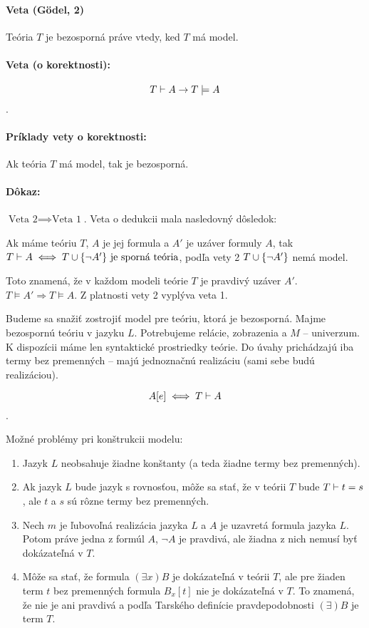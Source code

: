\paragraph{Veta (G\"odel, 2)} Teória $T$ je bezosporná práve vtedy, ked $T$ má
model.

\paragraph {Veta (o korektnosti):}
	$$T \vdash A \rightarrow T \models A$$.

\paragraph{Príklady vety o korektnosti:}
Ak teória $T$ má model, tak je bezosporná.

\paragraph{Dôkaz:}
$\mbox{Veta 2} \implies \mbox{Veta 1}$. Veta o dedukcii mala nasledovný
dôsledok:
\par Ak máme teóriu $T$, $A$ je jej formula a $A'$ je uzáver formuly $A$, tak $T
\vdash A \iff T \cup \{ \neg A' \} \mbox{ je sporná teória}$, podľa vety 2 $T
\cup \{ \neg A' \}$ nemá model.

\par Toto znamená, že v každom modeli teórie $T$ je pravdivý uzáver $A'$. $T
\models A' \Rightarrow T \models A$. Z platnosti vety 2 vyplýva veta 1.

\par Budeme sa snažiť zostrojiť model pre teóriu, ktorá je bezosporná. Majme
bezospornú teóriu v jazyku $L$. Potrebujeme relácie, zobrazenia a $M$ --
univerzum. K dispozícii máme len syntaktické prostriedky teórie. Do úvahy
prichádzajú iba termy bez premenných -- majú jednoznačnú realizáciu (sami sebe
budú realizáciou).

$$A[e] \iff T \vdash A $$.

Možné problémy pri konštrukcii modelu:
\begin{enumerate}
	\item Jazyk $L$ neobsahuje žiadne konštanty (a teda žiadne termy bez
		premenných).
	\item Ak jazyk $L$ bude jazyk s rovnosťou, môže sa stať, že v teórii $T$
		bude $T \vdash t=s$, ale $t$ a $s$ sú rôzne termy bez
		premenných.
	\item Nech $m$ je ľubovoľná realizácia jazyka $L$ a $A$ je uzavretá
		formula jazyka $L$. Potom práve jedna z formúl $A$, $\neg A$ je
		pravdivá, ale žiadna z nich nemusí byť dokázateľná v $T$.
	\item Môže sa stať, že formula $(\exists x)B$ je dokázateľná v teórii
		$T$, ale pre žiaden term $t$ bez premenných formula $B_x[t]$ nie
		je dokázateľná v $T$. To znamená, že nie je ani pravdivá a podľa
		Tarského definície pravdepodobnosti $(\exists)B$ je term $T$.
\end{enumerate}

